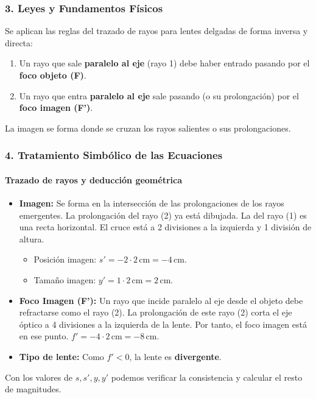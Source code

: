 \subsubsection*{3. Leyes y Fundamentos Físicos}
Se aplican las reglas del trazado de rayos para lentes delgadas de forma inversa y directa:
\begin{enumerate}
    \item Un rayo que sale \textbf{paralelo al eje} (rayo 1) debe haber entrado pasando por el \textbf{foco objeto (F)}.
    \item Un rayo que entra \textbf{paralelo al eje} sale pasando (o su prolongación) por el \textbf{foco imagen (F')}.
\end{enumerate}
La imagen se forma donde se cruzan los rayos salientes o sus prolongaciones.

\subsubsection*{4. Tratamiento Simbólico de las Ecuaciones}
\paragraph*{Trazado de rayos y deducción geométrica}
\begin{itemize}
    \item \textbf{Imagen:} Se forma en la intersección de las prolongaciones de los rayos emergentes. La prolongación del rayo (2) ya está dibujada. La del rayo (1) es una recta horizontal. El cruce está a 2 divisiones a la izquierda y 1 división de altura.
        \begin{itemize}
            \item Posición imagen: $s' = -2 \cdot 2\,\text{cm} = -4\,\text{cm}$.
            \item Tamaño imagen: $y' = 1 \cdot 2\,\text{cm} = 2\,\text{cm}$.
        \end{itemize}
    \item \textbf{Foco Imagen (F'):} Un rayo que incide paralelo al eje desde el objeto debe refractarse como el rayo (2). La prolongación de este rayo (2) corta el eje óptico a 4 divisiones a la izquierda de la lente. Por tanto, el foco imagen está en ese punto. $f' = -4 \cdot 2\,\text{cm} = -8\,\text{cm}$.
    \item \textbf{Tipo de lente:} Como $f'<0$, la lente es \textbf{divergente}.
\end{itemize}
Con los valores de $s, s', y, y'$ podemos verificar la consistencia y calcular el resto de magnitudes.

